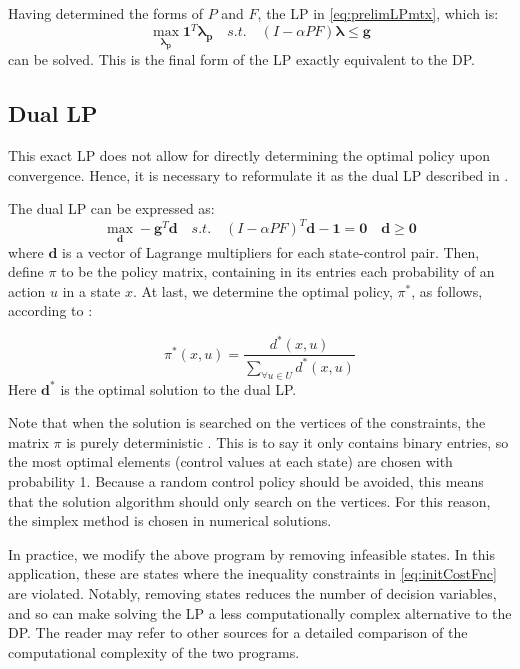 \documentclass[conference]{IEEEtran}
\begin{document}
Having determined the forms of $P$ and $F$, the LP in \eqref{eq:prelimLPmtx}, which is:
\begin{equation} \label{eq:LPfinal}
    \max_{\boldsymbol{\lambda_{p}}} \boldsymbol{1}^{T} \boldsymbol{\lambda_{p}}
    \hspace{1em}s.t.\hspace{1em}
    (I-\alpha PF)\boldsymbol{\lambda} \leq \boldsymbol{g}
\end{equation} can be solved. This is the final form of the LP exactly equivalent to the DP. 

\subsection{Dual LP}
This exact LP does not allow for directly determining the optimal policy upon convergence. Hence, it is necessary to reformulate it as the dual LP described in \cite{4220813}.

The dual LP can be expressed as:
\begin{equation}
    \max_{\boldsymbol{d}} -\boldsymbol{g}^{T} \boldsymbol{d}
    \hspace{1em}s.t.\hspace{1em}(I-\alpha PF)^{T}\boldsymbol{d} - \boldsymbol{1} = \boldsymbol{0}\hspace{1em}\boldsymbol{d} \geq \boldsymbol{0}
\end{equation}
where $\boldsymbol{d}$ is a vector of Lagrange multipliers for each state-control pair. Then, define $\pi$ to be the policy matrix, containing in its entries each probability of an action $u$ in a state $x$. At last, we determine the optimal policy, $\pi^{*}$, as follows, according to \cite{4220813}:

\begin{equation}
\pi^{*}(x,u)=\frac{d^{*}(x,u)}{\sum_{\forall u \in U}d^{*}(x,u)}
\end{equation} Here $\boldsymbol{d^{*}}$ is the optimal solution to the dual LP.

Note that when the solution is searched on the vertices of the constraints, the matrix $\pi$ is purely deterministic \cite{MDPs}. This is to say it only contains binary entries, so the most optimal elements (control values at each state) are chosen with probability 1. Because a random control policy should be avoided, this means that the solution algorithm should only search on the vertices. For this reason, the simplex method is chosen in numerical solutions.

In practice, we modify the above program by removing infeasible states. In this application, these are states where the inequality constraints in \eqref{eq:initCostFnc} are violated. Notably, removing states reduces the number of decision variables, and so can make solving the LP a less computationally complex alternative to the DP. The reader may refer to other sources for a detailed comparison of the computational complexity of the two programs.
\end{document}
